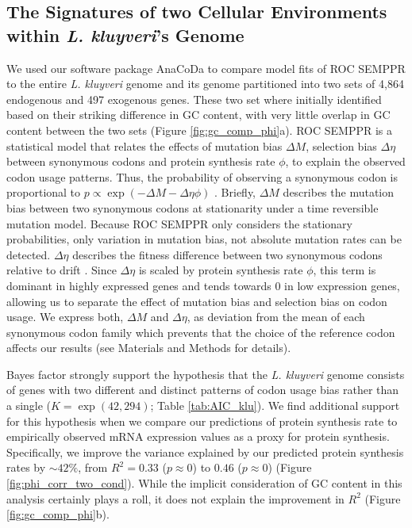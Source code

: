 \documentclass[doublespacing,linenumbers]{bmcart-modified}
\newcommand{\kluyveri}{\textit{L. kluyveri}\xspace}
\newcommand{\ROC}{ROC SEMPPR\xspace}
\newcommand{\GC}{GC content\xspace}
\newcommand{\DM}{\ensuremath{{\Delta M}}\xspace}
\newcommand{\DE}{\ensuremath{{\Delta \eta}}\xspace}
\begin{document}
\subsection*{The Signatures of two Cellular Environments within \kluyveri's Genome}
We used our software package AnaCoDa \citep{landerer2018} to compare model fits of \ROC to the entire \kluyveri genome and its genome partitioned into two sets of 4,864 endogenous and 497 exogenous genes.
These two set where initially identified based on their striking difference in \GC \cite{payen2009}, with very little overlap in \GC between the two sets (Figure \ref{fig:gc_comp_phi}a).
\ROC is a statistical model that relates the effects of mutation bias \DM, selection bias \DE between synonymous codons and protein synthesis rate $\phi$, to explain the observed codon usage patterns.
Thus, the probability of observing a synonymous codon is proportional to $p \propto \exp(-\DM-\DE\phi)$ \citep{gilchrist2015}.
Briefly, \DM describes the mutation bias between two synonymous codons at stationarity under a time reversible mutation model.
Because \ROC only considers the stationary probabilities, only variation in mutation bias, not absolute mutation rates can be detected.
\DE describes the fitness difference between two synonymous codons relative to drift \citep{gilchrist2015}. 
Since \DE is scaled by protein synthesis rate $\phi$, this term is dominant in highly expressed genes and tends towards 0 in low expression genes, allowing us to separate the effect of mutation bias and selection bias on codon usage. 
We express both, \DM and \DE, as deviation from the mean of each synonymous codon family which prevents that the choice of the reference codon affects our results (see Materials and Methods for details).

Bayes factor strongly support the hypothesis that the \kluyveri genome consists of genes with two different and distinct patterns of codon usage bias rather than a single ($K = \exp(42,294)$; Table \ref{tab:AIC_klu}).
We find additional support for this hypothesis when we compare our predictions of protein synthesis rate to empirically observed mRNA expression values as a proxy for protein synthesis.
Specifically, we improve the variance explained by our predicted protein synthesis rates by $\sim 42\%$, from $R^2 = 0.33$ ($p \approx 0$) to $0.46$ ($p \approx 0$) (Figure \ref{fig:phi_corr_two_cond}).
While the implicit consideration of \GC in this analysis certainly plays a roll, it does not explain the improvement in $R^2$ (Figure \ref{fig:gc_comp_phi}b).
\end{document}
